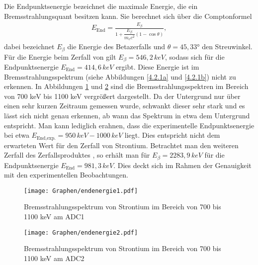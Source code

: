 \documentclass[twoside,colorback,accentcolor=tud4c,11pt]{tudreport}
\begin{document}
Die Endpunktsenergie bezeichnet die maximale Energie, die ein Bremsstrahlungsquant besitzen kann. Sie berechnet sich über die Comptonformel
\begin{align*}
E_{\text{End}}=\frac{E_{\beta}}{1+\dfrac{E_{\beta}}{m_ec^2}\left(1-\cos{\theta}\right)},
\end{align*}
dabei bezeichnet $E_{\beta}$ die Energie des Betazerfalls und $\theta=45,33$° den Streuwinkel. Für die Energie beim Zerfall von  gilt $E_{\beta}=546,2\,\si{keV}$, sodass sich für die Endpunktsenergie $E_{\text{End}}=414,6\,\si{keV}$ ergibt. Diese Energie ist im Bremsstrahlungsspektrum (siehe Abbildungen \ref{4.2.1a} und \ref{4.2.1b}) nicht zu erkennen. In Abbildungen \ref{4.2.1c} und \ref{4.2.1d} sind die Bremsstrahlungsspektren im Bereich von 700 keV bis 1100 keV vergrößert dargestellt. Da der Untergrund nur über einen sehr kurzen Zeitraum gemessen wurde, schwankt dieser sehr stark und es lässt sich nicht genau erkennen, ab wann das Spektrum in etwa dem Untergrund entspricht. Man kann lediglich erahnen, dass die experimentelle Endpunktsenergie bei etwa $E_{\text{End,exp.}}=950\,\si{keV} - 1000\,\si{keV}$ liegt. Dies entspricht nicht dem erwarteten Wert für den Zerfall von Strontium. Betrachtet man den weiteren Zerfall des Zerfallsproduktes , so erhält man für $E_{\beta}=2283,9\,\si{keV}$ für die Endpunktsenergie  $E_{\text{End}}=981,3\,\si{keV}$. Dies deckt sich im Rahmen der Genauigkeit mit den experimentellen Beobachtungen.
\begin{figure}[H]
\centering
   	\begin{minipage}[b]{1\textwidth}
   	\texttt{[image: Graphen/endenergie1.pdf]}
   	\caption{Bremsstrahlungsspektrum von Strontium im Bereich von 700 bis 1100 keV am ADC1}
  	\label{4.2.1c}
   	\end{minipage}
\end{figure}  
\begin{figure}[H]
\centering
   	\begin{minipage}[b]{1\textwidth}
   	\texttt{[image: Graphen/endenergie2.pdf]}
   	\caption{Bremsstrahlungsspektrum von Strontium im Bereich von 700 bis 1100 keV am ADC2}
  	\label{4.2.1d}
   	\end{minipage}
\end{figure}
\end{document}
